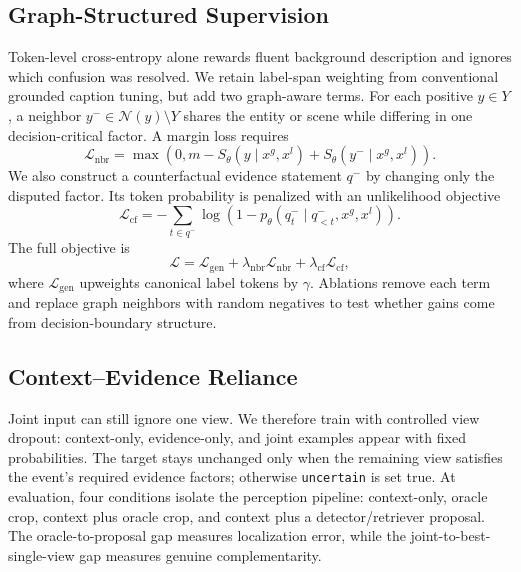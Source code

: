 \subsection{Graph-Structured Supervision}

Token-level cross-entropy alone rewards fluent background description and ignores which confusion was resolved. We retain label-span weighting from conventional grounded caption tuning, but add two graph-aware terms. For each positive $y\in Y$, a neighbor $y^{-}\in\mathcal{N}(y)\setminus Y$ shares the entity or scene while differing in one decision-critical factor. A margin loss requires
\begin{equation}
 \mathcal{L}_{\mathrm{nbr}}=
 \max\!\left(0,m-S_{\theta}(y\mid x^g,x^l)+S_{\theta}(y^{-}\mid x^g,x^l)\right).
\end{equation}
We also construct a counterfactual evidence statement $q^{-}$ by changing only the disputed factor. Its token probability is penalized with an unlikelihood objective
\begin{equation}
 \mathcal{L}_{\mathrm{cf}}=-\sum_{t\in q^{-}}\log\left(1-p_{\theta}(q^{-}_t\mid q^{-}_{<t},x^g,x^l)\right).
\end{equation}
The full objective is
\begin{equation}
 \mathcal{L}=\mathcal{L}_{\mathrm{gen}}+
 \lambda_{\mathrm{nbr}}\mathcal{L}_{\mathrm{nbr}}+
 \lambda_{\mathrm{cf}}\mathcal{L}_{\mathrm{cf}},
\end{equation}
where $\mathcal{L}_{\mathrm{gen}}$ upweights canonical label tokens by $\gamma$. Ablations remove each term and replace graph neighbors with random negatives to test whether gains come from decision-boundary structure.

\subsection{Context--Evidence Reliance}

Joint input can still ignore one view. We therefore train with controlled view dropout: context-only, evidence-only, and joint examples appear with fixed probabilities. The target stays unchanged only when the remaining view satisfies the event's required evidence factors; otherwise \texttt{uncertain} is set true. At evaluation, four conditions isolate the perception pipeline: context-only, oracle crop, context plus oracle crop, and context plus a detector/retriever proposal. The oracle-to-proposal gap measures localization error, while the joint-to-best-single-view gap measures genuine complementarity.

